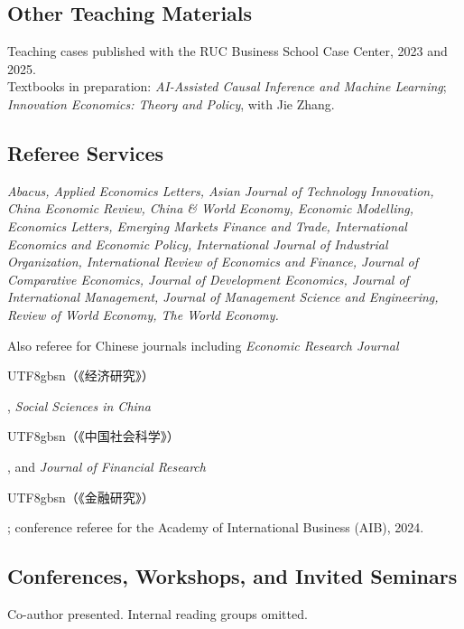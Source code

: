 \documentclass[letterpaper]{article}
\newcommand{\cj}[1]{{\begin{CJK}{UTF8}{gbsn}#1\end{CJK}}}
\begin{document}
\subsection*{Other Teaching Materials}
Teaching cases published with the RUC Business School Case Center, 2023 and 2025. \\
Textbooks in preparation: \textit{AI-Assisted Causal Inference and Machine Learning}; \textit{Innovation Economics: Theory and Policy}, with Jie Zhang.

\subsection*{Referee Services}
{\it Abacus, Applied Economics Letters, Asian Journal of Technology Innovation, China Economic Review, China \& World Economy, Economic Modelling, Economics Letters, Emerging Markets Finance and Trade, International Economics and Economic Policy, International Journal of Industrial Organization, International Review of Economics and Finance, Journal of Comparative Economics, Journal of Development Economics, Journal of International Management, Journal of Management Science and Engineering, Review of World Economy, The World Economy.}

Also referee for Chinese journals including \textit{Economic Research Journal} \cj{（《经济研究》）}, \textit{Social Sciences in China} \cj{（《中国社会科学》）}, and \textit{Journal of Financial Research} \cj{（《金融研究》）}; conference referee for the Academy of International Business (AIB), 2024.

\subsection*{Conferences, Workshops, and Invited Seminars}
{\footnotesize * Co-author presented. Internal reading groups omitted.}
\end{document}
